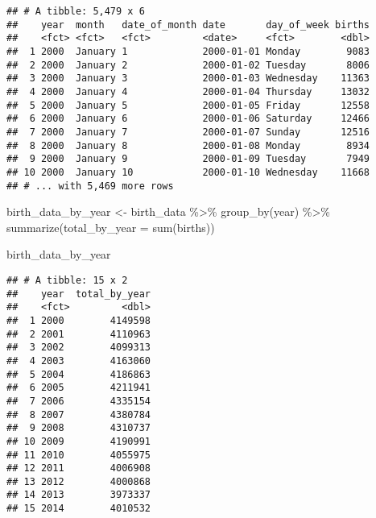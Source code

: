 \documentclass[
]{article}
\newenvironment{Shaded}{\begin{snugshade}}{\end{snugshade}}
\newcommand{\AttributeTok}[1]{\textcolor[rgb]{0.77,0.63,0.00}{#1}}
\newcommand{\FunctionTok}[1]{\textcolor[rgb]{0.00,0.00,0.00}{#1}}
\newcommand{\NormalTok}[1]{#1}
\newcommand{\OtherTok}[1]{\textcolor[rgb]{0.56,0.35,0.01}{#1}}
\newcommand{\SpecialCharTok}[1]{\textcolor[rgb]{0.00,0.00,0.00}{#1}}
\begin{document}
\begin{verbatim}
## # A tibble: 5,479 x 6
##    year  month   date_of_month date       day_of_week births
##    <fct> <fct>   <fct>         <date>     <fct>        <dbl>
##  1 2000  January 1             2000-01-01 Monday        9083
##  2 2000  January 2             2000-01-02 Tuesday       8006
##  3 2000  January 3             2000-01-03 Wednesday    11363
##  4 2000  January 4             2000-01-04 Thursday     13032
##  5 2000  January 5             2000-01-05 Friday       12558
##  6 2000  January 6             2000-01-06 Saturday     12466
##  7 2000  January 7             2000-01-07 Sunday       12516
##  8 2000  January 8             2000-01-08 Monday        8934
##  9 2000  January 9             2000-01-09 Tuesday       7949
## 10 2000  January 10            2000-01-10 Wednesday    11668
## # ... with 5,469 more rows
\end{verbatim}

\begin{Shaded}
\begin{Highlighting}[]
\NormalTok{birth\_data\_by\_year }\OtherTok{\textless{}{-}}\NormalTok{ birth\_data }\SpecialCharTok{\%\textgreater{}\%} 
  \FunctionTok{group\_by}\NormalTok{(year) }\SpecialCharTok{\%\textgreater{}\%} 
  \FunctionTok{summarize}\NormalTok{(}\AttributeTok{total\_by\_year =} \FunctionTok{sum}\NormalTok{(births))}

\NormalTok{birth\_data\_by\_year}
\end{Highlighting}
\end{Shaded}

\begin{verbatim}
## # A tibble: 15 x 2
##    year  total_by_year
##    <fct>         <dbl>
##  1 2000        4149598
##  2 2001        4110963
##  3 2002        4099313
##  4 2003        4163060
##  5 2004        4186863
##  6 2005        4211941
##  7 2006        4335154
##  8 2007        4380784
##  9 2008        4310737
## 10 2009        4190991
## 11 2010        4055975
## 12 2011        4006908
## 13 2012        4000868
## 14 2013        3973337
## 15 2014        4010532
\end{verbatim}
\end{document}
